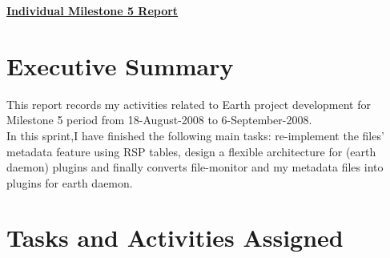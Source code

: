 \documentclass{article}
\begin{document}
\pagestyle{headings}

\begin{center}
{\LARGE\textbf{\underline{{Individual Milestone 5 Report}}}}
\end{center}

\section*{Executive Summary}
This report records my activities related to Earth project development for Milestone 5 period from 18-August-2008 to 6-September-2008.\\
In this sprint,I have finished the following main tasks: re-implement the files' metadata feature using RSP tables, design a flexible architecture for (earth daemon) plugins and finally converts file-monitor and my metadata files into plugins for earth daemon.     

\section*{Tasks and Activities Assigned}
\end{document}
